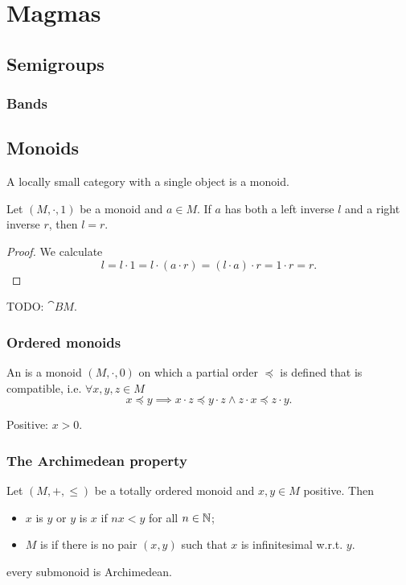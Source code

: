 \chapter{Magmas}
\section{Semigroups}

\subsection{Bands}

\section{Monoids}

\begin{lemma}
A locally small category with a single object is a monoid.
\end{lemma}

\begin{proposition} \label{prop:leftRightInverseMonoid}
Let $(M,\cdot,1)$ be a monoid and $a\in M$. If $a$ has both a left inverse $l$ and a right inverse $r$, then $l=r$.
\end{proposition}
\begin{proof}
We calculate
\[ l = l\cdot 1 = l\cdot(a\cdot r) = (l\cdot a)\cdot r= 1\cdot r = r. \]
\end{proof}

TODO:  $\cat{B}M$.

\subsection{Ordered monoids}
\begin{definition}
An  is a monoid $(M, \cdot, 0)$ on which a partial order $\preceq$ is defined that is compatible, i.e. $\forall x,y,z\in M$
\[ x\preceq y \implies x\cdot z \preceq y \cdot z \land z\cdot x \preceq z \cdot y. \]

Positive: $x > 0$.
\end{definition}

\subsection{The Archimedean property}
\begin{definition}
Let $(M,+,\leq)$ be a totally ordered monoid and $x,y\in M$ positive. Then
\begin{itemize}
\item $x$ is  $y$ or $y$ is  $x$ if $nx<y$ for all $n\in\mathbb{N}$;
\item $M$ is  if there is no pair $(x,y)$ such that $x$ is infinitesimal w.r.t. $y$.
\end{itemize}
\end{definition}
every submonoid is Archimedean.

